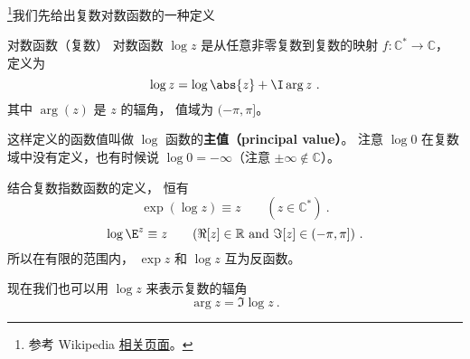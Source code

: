 
\begin{issues}
\issueDraft
\end{issues}


\footnote{参考 Wikipedia \href{https://en.wikipedia.org/wiki/Complex_logarithm}{相关页面}。}我们先给出复数对数函数的一种定义
\begin{definition}{对数函数（复数）}
对数函数 $\log z$ 是从任意非零复数到复数的映射 $f:\mathbb C^*\to \mathbb C$， 定义为
\begin{equation}
\log z = \log\abs{z} + \I \arg z~.
\end{equation}
其中 $\arg(z)$ 是 $z$ 的辐角， 值域为 $(-\pi, \pi]$。
\end{definition}
这样定义的函数值叫做 $\log$ 函数的\textbf{主值（principal value）}。 注意 $\log 0$ 在复数域中没有定义，也有时候说 $\log 0 = -\infty$（注意 $\pm\infty \notin \mathbb C$）。

结合复数指数函数的定义， 恒有
\begin{equation}
\exp(\log z) \equiv z \qquad (z \in \mathbb C^*)~.
\end{equation}
\begin{equation}
\log \E^z \equiv z \qquad (\Re[z]\in\mathbb R \text{ and } \Im[z]\in(-\pi, \pi])~.
\end{equation}
所以在有限的范围内， $\exp z$ 和 $\log z$ 互为反函数。

现在我们也可以用 $\log z$ 来表示复数的辐角
\begin{equation}
\arg z = \Im\log z~.
\end{equation}
